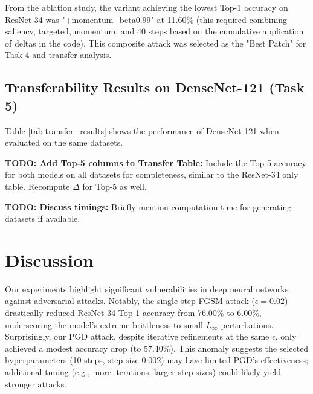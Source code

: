 \documentclass[letterpaper]{article}
\begin{document}
From the ablation study, the variant achieving the lowest Top-1 accuracy on ResNet-34 was "+momentum\_beta0.99" at 11.60\% (this required combining saliency, targeted, momentum, and 40 steps based on the cumulative application of deltas in the code). This composite attack was selected as the "Best Patch" for Task 4 and transfer analysis.

\subsection{Transferability Results on DenseNet-121 (Task 5)}
Table \ref{tab:transfer_results} shows the performance of DenseNet-121 when evaluated on the same datasets.

\begin{table}[h!]
\centering
\caption{Model Accuracy on Adversarial Datasets (Crafted on ResNet-34)}
\label{tab:transfer_results}
\end{table}
\textbf{TODO: Add Top-5 columns to Transfer Table:} Include the Top-5 accuracy for both models on all datasets for completeness, similar to the ResNet-34 only table. Recompute $\Delta$ for Top-5 as well.

\textbf{TODO: Discuss timings:} Briefly mention computation time for generating datasets if available.

\section{Discussion}

Our experiments highlight significant vulnerabilities in deep neural networks against adversarial attacks. Notably, the single-step FGSM attack ($\epsilon=0.02$) drastically reduced ResNet-34 Top-1 accuracy from 76.00\% to 6.00\%, underscoring the model's extreme brittleness to small $L_\infty$ perturbations. Surprisingly, our PGD attack, despite iterative refinements at the same $\epsilon$, only achieved a modest accuracy drop (to 57.40\%). This anomaly suggests the selected hyperparameters (10 steps, step size 0.002) may have limited PGD's effectiveness; additional tuning (e.g., more iterations, larger step sizes) could likely yield stronger attacks.
\end{document}

